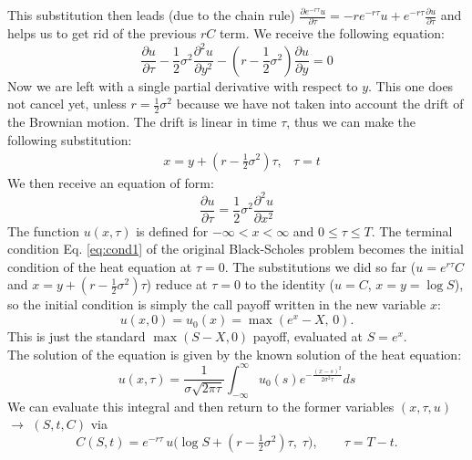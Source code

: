 \documentclass[11pt]{article}
\begin{document}
This substitution then leads (due to the chain rule) $\frac{\partial e^{-r\tau} u}{\partial \tau} = -r e^{-r\tau}u + e^{-r\tau} \frac{\partial u}{\partial \tau}$ and helps us to get rid of the previous $rC$ term. We receive the following equation:
\begin{equation}
    \frac{\partial u}{\partial \tau} - \frac{1}{2}\sigma^2 \frac{\partial^2 u}{\partial y^2} - (r - \frac{1}{2} \sigma^2) \frac{\partial u}{\partial y} = 0
    \label{eq:bs4}
\end{equation}
Now we are left with a single partial derivative with respect to $y$. This one does not cancel yet, unless $r=\frac{1}{2}\sigma^2$ because we have not taken into account the drift of the Brownian motion. The drift is linear in time $\tau$, thus we can make the following substitution:
\begin{align}
    & x = y + (r - \frac{1}{2}\sigma^2) \tau,
    & \tau = t
\end{align}
We then receive an equation of form:
\begin{equation}
    \frac{\partial u}{\partial \tau} = \frac{1}{2}\sigma^2 \frac{\partial^2 u}{\partial x^2}
    \label{eq:diffusion}
\end{equation}
The function $u(x,\tau)$ is defined for $-\infty < x < \infty$ and $0 \leq \tau \leq T$. The terminal condition Eq. \ref{eq:cond1} of the original Black-Scholes problem becomes the initial condition of the heat equation at $\tau=0$. The substitutions we did so far ($u=e^{r\tau}C$ and $x = y + (r-\frac{1}{2}\sigma^2)\tau$) reduce at $\tau=0$ to the identity ($u=C$, $x = y = \log S$), so the initial condition is simply the call payoff written in the new variable $x$:
\begin{equation}
    u(x,0) = u_0(x) = \max(e^x - X,\,0).
    \label{eq:ic}
\end{equation}
This is just the standard $\max(S-X,0)$ payoff, evaluated at $S = e^x$.\\
The solution of the equation is given by the known solution of the heat equation:
\begin{equation}
    u(x,\tau) = \frac{1}{\sigma \sqrt{2\pi \tau}} \int_{-\infty}^{\infty} u_0 (s) e^{-\frac{(x-s)^2}{2\sigma^2 \tau}} ds
\end{equation}
We can evaluate this integral and then return to the former variables $(x, \tau, u)$ $\rightarrow$ $(S,t,C)$ via
\begin{equation}
    C(S,t) = e^{-r\tau}\, u\bigl(\log S + (r - \tfrac{1}{2}\sigma^2)\tau,\;\tau\bigr),\qquad \tau = T-t.
    \label{eq:inversion}
\end{equation}
\end{document}
